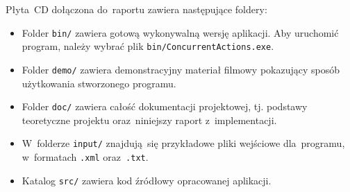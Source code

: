 \documentclass[11pt,a4paper]{article}
\begin{document}
Płyta~CD dołączona do~raportu zawiera następujące foldery:

\begin{itemize}
    \item Folder \verb+bin/+ zawiera gotową wykonywalną wersję aplikacji.
    Aby uruchomić program, należy wybrać plik \verb+bin/ConcurrentActions.exe+.
    \item Folder \verb+demo/+ zawiera demonstracyjny materiał filmowy pokazujący sposób użytkowania stworzonego programu.
    \item Folder \verb+doc/+ zawiera całość dokumentacji projektowej, tj. podstawy teoretyczne projektu oraz~niniejszy raport z~implementacji.
    \item W~folderze \verb+input/+ znajdują~się przykładowe pliki wejściowe dla~programu, w~formatach \verb+.xml+ oraz~\verb+.txt+.
    \item Katalog \verb+src/+ zawiera kod źródłowy opracowanej aplikacji.
\end{itemize}
\end{document}
